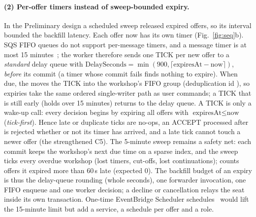 \paragraph{(2) Per-offer timers instead of sweep-bounded expiry.}
In the Preliminary design a scheduled sweep released expired offers, so its interval bounded the
backfill latency. Each offer now has its own timer (Fig.~\ref{fig:seq}b). SQS FIFO queues do not
support per-message timers, and a message timer is at most 15 minutes~\cite{aws-sqs-timers}; the
worker therefore sends one TICK per new offer to a \emph{standard} delay queue with
$\text{DelaySeconds} = \min(900, \lceil \text{expiresAt} - \text{now} \rceil)$, \emph{before} its
commit (a timer whose commit fails finds nothing to expire). When due, the 
moves the TICK into the workshop's FIFO group (deduplication id ), so
expiries take the same ordered single-writer path as user commands; a TICK that is still early
(holds over 15 minutes) returns to the delay queue. A TICK is only a wake-up call: every decision
begins by expiring all offers with $\text{expiresAt} \leq \text{now}$ (\emph{tick-first}). Hence late
or duplicate ticks are no-ops, an ACCEPT processed after  is rejected whether or not
its timer has arrived, and a late tick cannot touch a newer offer (the strengthened C5). The
5-minute sweep remains a safety net: each commit keeps the workshop's next due time on a sparse
index, and the sweep ticks every overdue workshop (lost timers, cut-offs, lost continuations);
 counts offers it expired more than 60\,s late (expected 0). The backfill
budget of an expiry is thus the delay-queue rounding (whole seconds), one forwarder invocation, one
FIFO enqueue and one worker decision; a decline or cancellation relays the seat inside its own
transaction. One-time EventBridge Scheduler schedules~\cite{aws-eventbridge-scheduler-types} would
lift the 15-minute limit but add a service, a schedule per offer and a role.

